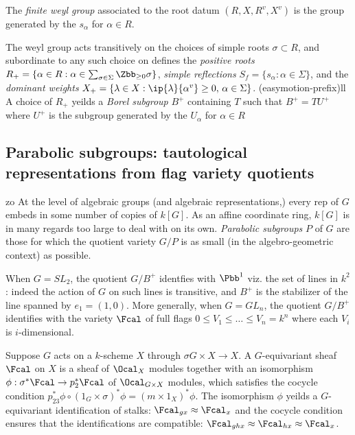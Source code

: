 \documentclass{amsart}
\begin{document}
    The \emph{finite weyl group} associated to the root datum $(R,X,R^v,X^v)$ is the group generated by the $s_\alpha$ for $\alpha \in R$.

    The weyl group acts transitively on the choices of simple roots $\sigma \subset R$, and subordinate to any such choice on defines the \emph{positive roots}$R_+=\{\alpha \in R : \alpha \in \sum_{\sigma \in \Sigma} \Zbb_{\geq 0} \sigma \}$, \emph{simple reflections} $S_f = \{s_\alpha : \alpha \in \Sigma\}$, and the \emph{dominant weights} $X_+ = \{ \lambda \in X : \ip{\lambda}{\alpha^v}\geq 0, \, \alpha \in\Sigma \}$.
    (easymotion-prefix)ll
    A choice of $R_+$ yeilds a \emph{Borel subgroup} $B^+$ containing $T$ such that $B^+=TU^+$ where $U^+$ is the subgroup generated by the $U_\alpha$ for $\alpha \in R$

    \subsection{Parabolic subgroups: tautological representations from flag variety quotients}zo
       At the level of algebraic groups (and algebraic representations,) every rep of $G$ embeds in
       some number of copies of $k[G]$. As an affine coordinate ring, $k[G]$ is in many regards too large to deal with on its own. \emph{Parabolic subgroups} $P$ of $G$ are those for which the quotient variety $G/P$ is as small (in the algebro-geometric context) as possible.

       When $G=SL_2$, the quotient $G/B^+$ identfies with $\Pbb^1$ viz. the set of lines in $k^2$: indeed the action of $G$ on such lines is transitive, and $B^+$ is the stabilizer of the line spanned by $e_1 = (1,0)$. More generally, when $G=GL_n$, the quotient $G/B^+$ identifies with the variety $\Fcal$ of full flags $0 \leq V_1 \leq \ldots \leq V_n = k^n$ where each $V_i$ is $i$-dimensional.
\begin{mydef}
  Suppose $G$ acts on a $k$-scheme $X$ through $\sigma G \times X \to X$. A $G$-equivariant sheaf $\Fcal$ on $X$ is a sheaf of $\Ocal_X$ modules together with an isomorphism $\phi: \sigma^* \Fcal \to p_2^* \Fcal$ of $\Ocal_{G\times X}$ modules, which satisfies the cocycle condition $p^*_{23}\phi \circ (1_G \times \sigma)^*\phi = (m \times 1_X )^*\phi$.  The isomorphism $\phi$ yeilds a $G$-equivariant identification of stalks: $\Fcal_{gx} \approx \Fcal_x$ and the cocycle condition ensures that the identifications are compatible: $\Fcal_{ghx} \approx \Fcal_{hx} \approx \Fcal_x$.
\end{mydef}
\end{document}
